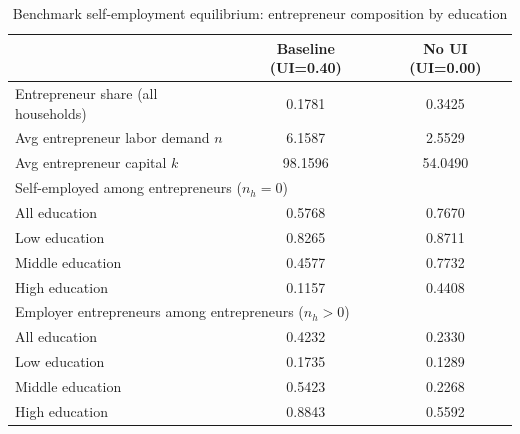 \begin{table}[H]
\caption{Benchmark self-employment equilibrium: entrepreneur composition by education}
\label{tab:self_employment_benchmark_baseline_vs_noui}
\centering
\small
\begin{tabular}{|l|c|c|}
\hline
 & Baseline (UI=0.40) & No UI (UI=0.00) \\
\hline
Entrepreneur share (all households) & 0.1781 & 0.3425 \\
\hline
Avg entrepreneur labor demand $n$ & 6.1587 & 2.5529 \\
\hline
Avg entrepreneur capital $k$ & 98.1596 & 54.0490 \\
\hline
\multicolumn{3}{|l|}{Self-employed among entrepreneurs ($n_h = 0$)} \\
\hline
All education & 0.5768 & 0.7670 \\
\hline
Low education & 0.8265 & 0.8711 \\
\hline
Middle education & 0.4577 & 0.7732 \\
\hline
High education & 0.1157 & 0.4408 \\
\hline
\multicolumn{3}{|l|}{Employer entrepreneurs among entrepreneurs ($n_h > 0$)} \\
\hline
All education & 0.4232 & 0.2330 \\
\hline
Low education & 0.1735 & 0.1289 \\
\hline
Middle education & 0.5423 & 0.2268 \\
\hline
High education & 0.8843 & 0.5592 \\
\hline
\end{tabular}
\end{table}
